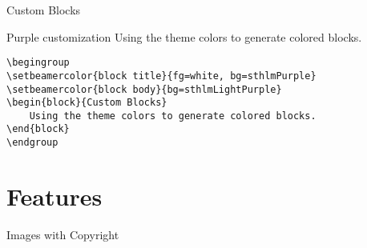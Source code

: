 \documentclass[newPxFont]{beamer}
\begin{document}

\begin{frame}[containsverbatim]{Custom Blocks}
\begingroup
{}
\begin{block}{Purple customization}
    Using the theme colors to generate colored blocks.
\end{block}
\endgroup
\begin{verbatim}
\begingroup
\setbeamercolor{block title}{fg=white, bg=sthlmPurple}
\setbeamercolor{block body}{bg=sthlmLightPurple}
\begin{block}{Custom Blocks}
    Using the theme colors to generate colored blocks.
\end{block}
\endgroup
\end{verbatim}
\end{frame}


%
%
\section{Features}


\begin{frame}{Images with Copyright}
    \begin{figure}
        \centering
    \end{figure}
\end{frame}

\end{document}
